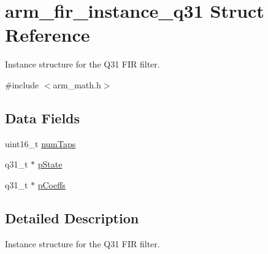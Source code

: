 \hypertarget{structarm__fir__instance__q31}{\section{arm\-\_\-fir\-\_\-instance\-\_\-q31 Struct Reference}
\label{structarm__fir__instance__q31}
}


Instance structure for the Q31 F\-I\-R filter.  




{\ttfamily \#include $<$arm\-\_\-math.\-h$>$}

\subsection*{Data Fields}
\begin{DoxyCompactItemize}
\item 
uint16\-\_\-t \hyperlink{structarm__fir__instance__q31_a751941891e47f522a7f5375fe8990aac}{num\-Taps}
\item 
q31\-\_\-t $\ast$ \hyperlink{structarm__fir__instance__q31_adee4ba3ee8869865af7d8fa08ca913d6}{p\-State}
\item 
q31\-\_\-t $\ast$ \hyperlink{structarm__fir__instance__q31_a68888e36167d81cb7836db10367a1682}{p\-Coeffs}
\end{DoxyCompactItemize}


\subsection{Detailed Description}
Instance structure for the Q31 F\-I\-R filter. 

